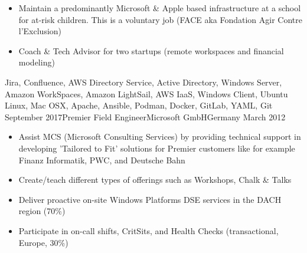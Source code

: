 \begin{experiences}
{\begin{itemize}
                        \item Maintain a predominantly Microsoft \& Apple based infrastructure at a school for at-risk children. This is a voluntary job (FACE aka Fondation Agir Contre l'Exclusion)

                        \item Coach \& Tech Advisor for two startups (remote workspaces and financial modeling)            
                      \end{itemize}
                    }
                    {Jira, Confluence, AWS Directory Service, Active Directory, Windows Server, Amazon WorkSpaces, Amazon LightSail, AWS IaaS, Windows Client, Ubuntu Linux, Mac OSX, Apache, Ansible, Podman, Docker, GitLab, YAML, Git}
  \emptySeparator
  \experience
    {September 2017}{Premier Field Engineer}{Microsoft GmbH}{Germany}
    {March 2012}    {
                      \begin{itemize}
                        \item Assist MCS (Microsoft Consulting Services) by providing technical support in developing 'Tailored to Fit' solutions for Premier customers like for example Finanz Informatik, PWC, and Deutsche Bahn

                        \item Create/teach different types of offerings such as Workshops, Chalk \& Talks  
                        
                        \item Deliver proactive on-site Windows Platforms DSE services in the DACH region (70\%)                   
 
                        \item Participate in on-call shifts, CritSits, and Health Checks (transactional, Europe, 30\%)    


\end{itemize}}
\end{experiences}
